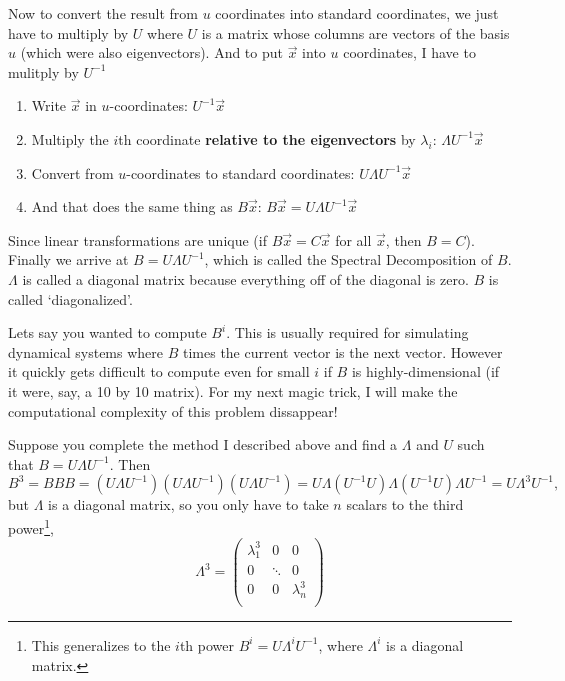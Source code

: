 \documentclass[12pt,letterpaper,oneside]{article}
\begin{document}
Now to convert the result from $u$ coordinates into standard coordinates, we just have to multiply by $U$ where $U$ is a matrix whose columns are vectors of the basis $u$ (which were also eigenvectors). And to put $\vec{x}$ into $u$ coordinates, I have to mulitply by $U^{-1}$

\begin{enumerate}
\item Write $\vec{x}$ in $u$-coordinates: $U^{-1}\vec{x}$
\item Multiply the $i$th coordinate \textbf{relative to the eigenvectors} by $\lambda_i$: $\Lambda U^{-1} \vec{x}$
\item Convert from $u$-coordinates to standard coordinates: $U\Lambda U^{-1} \vec{x}$
\item And that does the same thing as $B\vec{x}$: $B\vec{x} = U\Lambda U^{-1} \vec{x}$
\end{enumerate}

Since linear transformations are unique (if $B\vec{x} = C\vec{x}$ for all $\vec{x}$, then $B = C$). Finally we arrive at $B = U \Lambda U^{-1}$, which is called the Spectral Decomposition of $B$. $\Lambda$ is called a diagonal matrix because everything off of the diagonal is zero. $B$ is called `diagonalized'.

Lets say you wanted to compute $B^i$. This is usually required for simulating dynamical systems where $B$ times the current vector is the next vector. However it quickly gets difficult to compute even for small $i$ if $B$ is highly-dimensional (if it were, say, a 10 by 10 matrix). For my next magic trick, I will make the computational complexity of this problem dissappear!

Suppose you complete the method I described above and find a $\Lambda$ and $U$ such that $B = U \Lambda U^{-1}$. Then $$B^{3} = B B B = (U \Lambda U^{-1}) (U \Lambda U^{-1})  (U \Lambda U^{-1}) = U \Lambda (U^{-1}U) \Lambda (U^{-1} U) \Lambda U^{-1} = U \Lambda^3 U^{-1},$$
but $\Lambda$ is a diagonal matrix, so you only have to take $n$ scalars to the third power\footnote{This generalizes to the $i$th power $B^i = U \Lambda^i U^{-1}$, where $\Lambda^i$ is a diagonal matrix.},
$$\Lambda^3 = \begin{pmatrix}
\lambda_1^3 & 0 & 0 \\
  0 & \ddots & 0 \\
  0 & 0 & \lambda_n^3 \\
\end{pmatrix}$$
\end{document}

